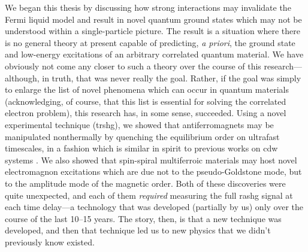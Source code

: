 % 

We began this thesis by discussing how strong interactions may invalidate the Fermi liquid model and result in novel quantum ground states which may not be understood within a single-particle picture.
The result is a situation where there is no general theory at present capable of predicting, \textit{a priori}, the ground state and low-energy excitations of an arbitrary correlated quantum material.
We have obviously not come any closer to such a theory over the course of this research---although, in truth, that was never really the goal.
Rather, if the goal was simply to enlarge the list of novel phenomena which can occur in quantum materials (acknowledging, of course, that this list is essential for solving the correlated electron problem), this research has, in some sense, succeeded.
Using a novel experimental technique (\gls{trshg}), we showed that antiferromagnets may be manipulated nonthermally by quenching the equilibrium order on ultrafast timescales, in a fashion which is similar in spirit to previous works on \gls{cdw} systems \citep{fausti_light-induced_2011,kogar_light-induced_2020}.
We also showed that spin-spiral multiferroic materials may host novel electromagnon excitations which are due not to the pseudo-Goldstone mode, but to the amplitude mode of the magnetic order.
Both of these discoveries were quite unexpected, and each of them \emph{required} measuring the full \gls{rashg} signal at each time delay---a technology that was developed (partially by us) only over the course of the last \num{10}--\num{15} years.
The story, then, is that a new technique was developed, and then that technique led us to new physics that we didn't previously know existed.


